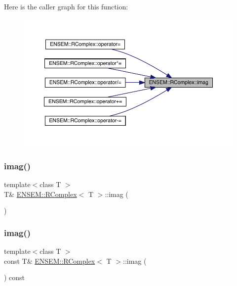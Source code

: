 Here is the caller graph for this function\+:\nopagebreak
\begin{figure}[H]
\begin{center}
\leavevmode
\includegraphics[width=350pt]{d9/d0e/classENSEM_1_1RComplex_af4f97cf18c025407a8e66f848252243d_icgraph}
\end{center}
\end{figure}
\mbox{\label{classENSEM_1_1RComplex_af4f97cf18c025407a8e66f848252243d}} 
\subsubsection{\texorpdfstring{imag()}{imag()}\hspace{0.1cm}{\footnotesize\ttfamily [2/4]}}
{\footnotesize\ttfamily template$<$class T $>$ \\
T\& \mbox{\hyperlink{classENSEM_1_1RComplex}{E\+N\+S\+E\+M\+::\+R\+Complex}}$<$ T $>$\+::imag (\begin{DoxyParamCaption}{ }\end{DoxyParamCaption})\hspace{0.3cm}{\ttfamily [inline]}}

\mbox{\label{classENSEM_1_1RComplex_a8df643a2ba06dc851d19eb35cd4c4cde}} 
\subsubsection{\texorpdfstring{imag()}{imag()}\hspace{0.1cm}{\footnotesize\ttfamily [3/4]}}
{\footnotesize\ttfamily template$<$class T $>$ \\
const T\& \mbox{\hyperlink{classENSEM_1_1RComplex}{E\+N\+S\+E\+M\+::\+R\+Complex}}$<$ T $>$\+::imag (\begin{DoxyParamCaption}{ }\end{DoxyParamCaption}) const\hspace{0.3cm}{\ttfamily [inline]}}

